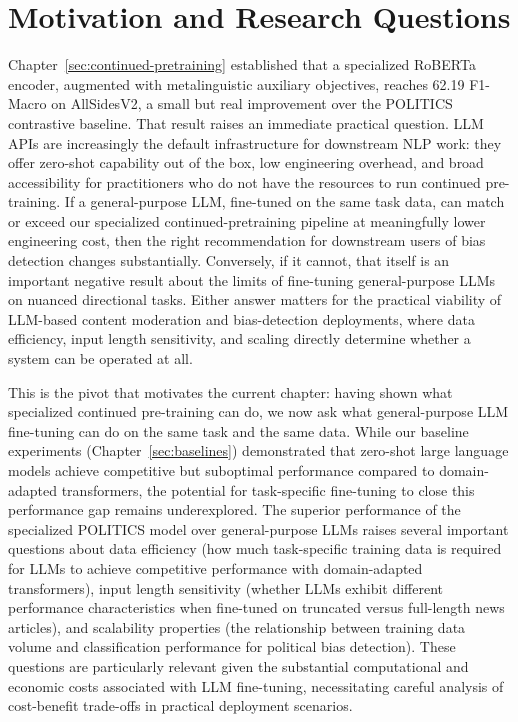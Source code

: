\section{Motivation and Research Questions}
\label{sec:llm-motivation}

Chapter~\ref{sec:continued-pretraining} established that a specialized RoBERTa encoder, augmented with metalinguistic auxiliary objectives, reaches 62.19 F1-Macro on AllSidesV2, a small but real improvement over the POLITICS contrastive baseline. That result raises an immediate practical question. LLM APIs are increasingly the default infrastructure for downstream NLP work: they offer zero-shot capability out of the box, low engineering overhead, and broad accessibility for practitioners who do not have the resources to run continued pre-training. If a general-purpose LLM, fine-tuned on the same task data, can match or exceed our specialized continued-pretraining pipeline at meaningfully lower engineering cost, then the right recommendation for downstream users of bias detection changes substantially. Conversely, if it cannot, that itself is an important negative result about the limits of fine-tuning general-purpose LLMs on nuanced directional tasks. Either answer matters for the practical viability of LLM-based content moderation and bias-detection deployments, where data efficiency, input length sensitivity, and scaling  directly determine whether a system can be operated at all.

This is the pivot that motivates the current chapter: having shown what specialized continued pre-training can do, we now ask what general-purpose LLM fine-tuning can do on the same task and the same data. While our baseline experiments (Chapter~\ref{sec:baselines}) demonstrated that zero-shot large language models achieve competitive but suboptimal performance compared to domain-adapted transformers, the potential for task-specific fine-tuning to close this performance gap remains underexplored. The superior performance of the specialized POLITICS model over general-purpose LLMs raises several important questions about data efficiency (how much task-specific training data is required for LLMs to achieve competitive performance with domain-adapted transformers), input length sensitivity (whether LLMs exhibit different performance characteristics when fine-tuned on truncated versus full-length news articles), and scalability properties (the relationship between training data volume and classification performance for political bias detection). These questions are particularly relevant given the substantial computational and economic costs associated with LLM fine-tuning, necessitating careful analysis of cost-benefit trade-offs in practical deployment scenarios.

